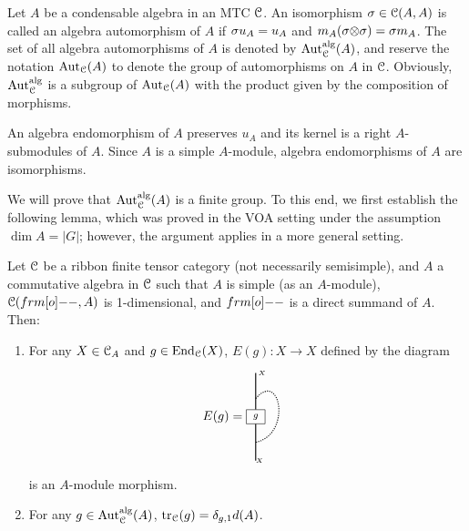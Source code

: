 \documentclass{amsart}
\begin{document}
\begin{defn} Let $A$ be a condensable algebra in an MTC ${\EuScript{C}}$.
    An isomorphism $\sigma \in {\EuScript{C}}(A,A)$ is called an algebra automorphism of $A$ if
    $\sigma u_A  = u_A$ and $m_A (\sigma {\otimes} \sigma) = \sigma m_A$. The set of all algebra automorphisms of $A$ is denoted by ${\operatorname{Aut}_{\EuScript{C}}^{\operatorname{alg}}}(A)$, and reserve the notation ${\operatorname{Aut}_{{\EuScript{C}}}}(A)$ to denote the group of  automorphisms on $A$ in ${\EuScript{C}}$. Obviously, ${\operatorname{Aut}_{\EuScript{C}}^{\operatorname{alg}}}$ is a subgroup of ${\operatorname{Aut}_{{\EuScript{C}}}}(A)$ with the product given by the composition of morphisms. 
\end{defn}
\begin{rmk}
An algebra endomorphism of $A$ preserves $u_A$ and its  kernel is a right $A$-submodules of $A$. Since $A$ is a simple $A$-module,  algebra endomorphisms of $A$ are isomorphisms.  
\end{rmk}
We will prove that ${\operatorname{Aut}_{\EuScript{C}}^{\operatorname{alg}}}(A)$ is a finite group. To this end, we first establish the following lemma, which was proved in the VOA setting \cite{McRae2021} under the assumption $\dim A=|G|$; however, the argument applies in a more general setting.
\begin{lem}\label{p5.26} Let ${\EuScript{C}}$ be a ribbon finite tensor category (not necessarily semisimple), and $A$ a commutative algebra in ${\EuScript{C}}$ such that $A$ is simple (as an $A$-module), $\CC(\1, A)$ is 1-dimensional, and $\1$ is a direct summand of $A$. 
Then:
\begin{enumerate}
\item For any $X \in {{\EuScript{C}}_A}$ and $g \in \operatorname{End}_{\EuScript{C}}(X)$, $E(g) : X \to X$ defined by the diagram 
$$
E(g)=\vcenter{\hbox{\begin{tikzpicture}[squarednode/.style={rectangle, draw=black,  minimum size=1pt}, baseline=0ex]
\node[squarednode](A) at (0,0) { $\hspace{2pt}\scriptstyle g \hspace{2pt}$}; 
\draw[thick] (A.90)-- +(0,1) node [xshift=5pt] {{\tiny $X$}};
\draw[thick] (A.270)-- +(0,-1)  node [xshift=3pt]{{\tiny $X$}};
\draw[thick,densely dotted] (0,.5) .. controls +(.7,.8) and +(1,.2) .. (0,-.7);
\end{tikzpicture}}}
$$
is an $A$-module morphism.
\item For any $g \in {\operatorname{Aut}_{\EuScript{C}}^{\operatorname{alg}}}(A)$, $\operatorname{tr}_{\EuScript{C}}(g) = \delta_{g, 1} d(A)$. 
\end{enumerate} 
\end{lem}
\end{document}
